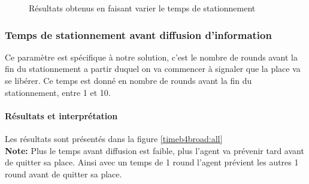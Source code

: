 \begin{figure}
\begin{center}
  \end{center}

  \caption{Résultats obtenus en faisant varier le temps de stationnement}
  \label{parktime:all}
\end{figure}

\subsubsection{Temps de stationnement avant diffusion d'information}

Ce paramètre est spécifique à notre solution, c'est le nombre de rounds avant la fin du stationnement a partir duquel on va commencer à signaler que la place va se libérer. Ce temps est donné en nombre de rounds avant la fin du stationnement, entre 1 et 10.


\paragraph{Résultats et interprétation}

Les résultats sont présentés dans la figure \ref{timeb4broad:all}\\

{\bf Note: } Plus le temps avant diffusion est faible, plus l'agent va prévenir tard avant de quitter sa place. Ainsi avec un temps de 1 round l'agent prévient les autres 1 round avant de quitter sa place.\\

